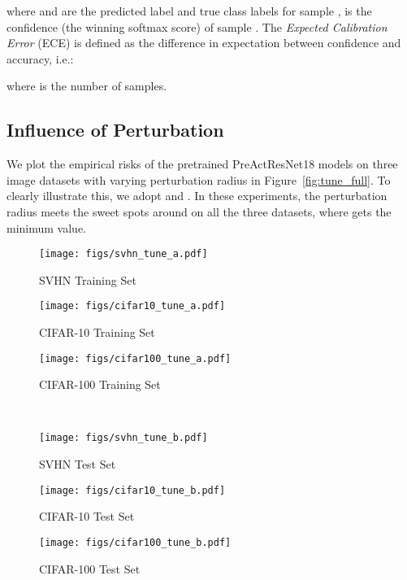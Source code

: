 \documentclass[final]{cvpr}
\begin{document}
where  and  are the predicted label and true class labels for sample ,  is the confidence (the winning softmax score) of sample . The {\em Expected Calibration Error} (ECE) is defined as the difference in expectation between confidence and accuracy, i.e.:

where  is the number of samples.

\subsection{Influence of Perturbation}\label{app:e}

We plot the empirical risks of the pretrained PreActResNet18 models on three image datasets with varying perturbation radius in Figure~\ref{fig:tune_full}. To clearly illustrate this, we adopt  and . In these experiments, the perturbation radius  meets the sweet spots around  on all the three datasets, where  gets the minimum value. 

\begin{figure*}[t]
\centering
\begin{subfigure}{0.66\columnwidth}\centering \captionsetup{width=0.9\columnwidth}\texttt{[image: figs/svhn\_tune\_a.pdf]}\caption{SVHN Training Set}\end{subfigure}\begin{subfigure}{0.66\columnwidth}\centering \captionsetup{width=0.9\columnwidth}\texttt{[image: figs/cifar10\_tune\_a.pdf]}\caption{CIFAR-10 Training Set}\end{subfigure}\begin{subfigure}{0.66\columnwidth}\centering \captionsetup{width=0.9\columnwidth}\texttt{[image: figs/cifar100\_tune\_a.pdf]}\caption{CIFAR-100 Training Set}\end{subfigure}\\
\begin{subfigure}{0.66\columnwidth}\centering \captionsetup{width=0.9\columnwidth}\texttt{[image: figs/svhn\_tune\_b.pdf]}\caption{SVHN Test Set}\end{subfigure}\begin{subfigure}{0.66\columnwidth}\centering \captionsetup{width=0.9\columnwidth}\texttt{[image: figs/cifar10\_tune\_b.pdf]}\caption{CIFAR-10 Test Set}\end{subfigure}\begin{subfigure}{0.66\columnwidth}\centering \captionsetup{width=0.9\columnwidth}\texttt{[image: figs/cifar100\_tune\_b.pdf]}\caption{CIFAR-100 Test Set}\end{subfigure}\caption{The comparison of  of the models trained with ERM (red) and AMP (blue) with varying perturbation radius.}
\label{fig:tune_full}
\end{figure*}
\end{document}
